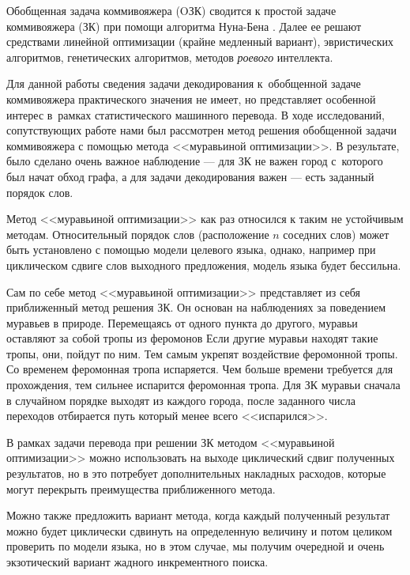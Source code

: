Обобщенная задача коммивояжера (OЗК) сводится к простой задаче коммивояжера (ЗК) 
при помощи алгоритма Нуна-Бена \cite{Noon:1993}.
Далее ее решают средствами линейной оптимизации (крайне медленный вариант), 
эвристических алгоритмов, генетических алгоритмов, методов \emph{роевого} интеллекта.

Для данной работы сведения задачи декодирования к~обобщенной 
задаче коммивояжера практического значения не имеет,
но представляет особенной интерес 
в~рамках статистического машинного перевода.
В ходе исследований, сопутствующих работе нами был рассмотрен 
метод решения обобщенной задачи коммивояжера 
с помощью метода <<муравьиной оптимизации>>.
В результате, было сделано очень важное наблюдение --- 
для ЗК не важен город с~которого был начат обход графа,
а для задачи декодирования важен --- есть заданный порядок слов.

Метод <<муравьиной оптимизации>> как раз относился 
к таким не устойчивым методам. 
Относительный порядок слов (расположение $n$ соседних слов) 
может быть установлено с помощью модели целевого языка,
однако, например при циклическом сдвиге слов выходного предложения,
модель языка будет бессильна.

Сам по себе метод <<муравьиной оптимизации>> представляет 
из себя приближенный метод решения ЗК. 
Он основан на наблюдениях за поведением муравьев в природе.
Перемещаясь от одного пункта до другого, муравьи оставляют 
за собой тропы из феромонов
Если другие муравьи находят такие тропы, они, пойдут по ним. 
Тем самым укрепят воздействие феромонной тропы.
Со временем феромонная тропа испаряется. 
Чем больше времени требуется для прохождения, 
тем сильнее испарится феромонная тропа. 
Для ЗК муравьи сначала в случайном порядке выходят 
из каждого города, после заданного 
числа переходов отбирается путь который менее всего <<испарился>>.

В рамках задачи перевода при решении ЗК методом <<муравьиной оптимизации>> 
можно использовать на выходе циклический сдвиг полученных результатов,
но в это потребует дополнительных накладных расходов, которые могут перекрыть 
преимущества приближенного метода.

Можно также предложить вариант метода, когда каждый полученный результат
можно будет циклически сдвинуть на определенную величину 
и потом целиком проверить по модели языка, но в этом случае,
мы получим очередной и очень экзотический вариант жадного инкрементного поиска.


\pagebreak

